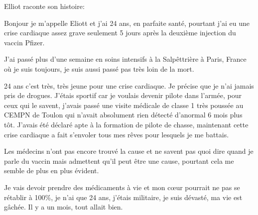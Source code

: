 Elliot raconte son histoire:

Bonjour je m'appelle Eliott et j'ai 24 ans, en parfaite santé, pourtant j'ai eu
une crise cardiaque assez grave seulement 5 jours après la deuxième injection du
vaccin Pfizer.

J'ai passé plus d'une semaine en soins intensifs à la Salpêttrière à Paris,
France où je suis toujours, je suis aussi passé pas très loin de la mort.

24 ans c'est très, très jeune pour une crise cardiaque. Je précise que je n'ai
jamais pris de drogues. J'étais sportif car je voulais devenir pilote dans
l'armée, pour ceux qui le savent, j'avais passé une visite médicale de classe 1
très poussée au CEMPN de Toulon qui n'avait absolument rien détecté d'anormal 6
mois plus tôt. J'avais été déclaré apte à la formation de pilote de chasse,
maintenant cette crise cardiaque a fait s'envoler tous mes rêves pour lesquels
je me battais.

Les médecins n'ont pas encore trouvé la cause et ne savent pas quoi dire quand
je parle du vaccin mais admettent qu'il peut être une cause, pourtant cela me
semble de plus en plus évident.

Je vais devoir prendre des médicaments à vie et mon cœur pourrait ne pas se
rétablir à 100\%, je n'ai que 24 ans, j'étais militaire, je suis dévasté, ma vie
est gâchée. Il y a un mois, tout allait bien.

